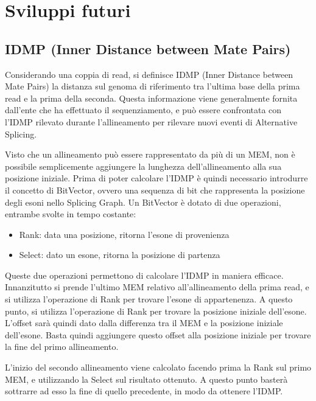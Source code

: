 \newpage

\section{Sviluppi futuri}

\subsection{IDMP (Inner Distance between Mate Pairs)}
Considerando una coppia di read, si definisce IDMP (Inner Distance between Mate Pairs) la distanza sul genoma di riferimento tra l'ultima base della prima read e la prima della seconda. Questa informazione viene generalmente fornita dall'ente che ha effettuato il sequenziamento, e può essere confrontata con l'IDMP rilevato durante l'allineamento per rilevare nuovi eventi di Alternative Splicing.

Visto che un allineamento può essere rappresentato da più di un MEM, non è possibile semplicemente aggiungere la lunghezza dell'allineamento alla sua posizione iniziale. Prima di poter calcolare l'IDMP è quindi necessario introdurre il concetto di BitVector, ovvero una sequenza di bit che rappresenta la posizione degli esoni nello Splicing Graph. Un BitVector è dotato di due operazioni, entrambe svolte in tempo costante:

\begin{itemize}
	\item Rank: data una posizione, ritorna l'esone di provenienza
	\item Select: dato un esone, ritorna la posizione di partenza 
\end{itemize}

Queste due operazioni permettono di calcolare l'IDMP in maniera efficace. Innanzitutto si prende l'ultimo MEM relativo all'allineamento della prima read, e si utilizza l'operazione di Rank per trovare l'esone di appartenenza. A questo punto, si utilizza l'operazione di Rank per trovare la posizione iniziale dell'esone. L'offset sarà quindi dato dalla differenza tra il MEM e la posizione iniziale dell'esone. Basta quindi aggiungere questo offset alla posizione iniziale per trovare la fine del primo allineamento.

L'inizio del secondo allineamento viene calcolato facendo prima la Rank sul primo MEM, e utilizzando la Select sul risultato ottenuto. A questo punto basterà sottrarre ad esso la fine di quello precedente, in modo da ottenere l'IDMP.

